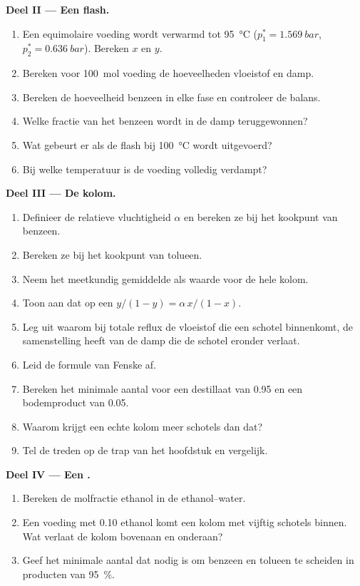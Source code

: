 \begin{problem}
\medskip
\noindent\textbf{Deel II --- Een flash.}
\begin{enumerate}[resume]
  \item Een equimolaire voeding wordt verwarmd tot \qty{95}{\degreeCelsius} ($p_1^* =
        \qty{1.569}{bar}$, $p_2^* = \qty{0.636}{bar}$). Bereken $x$ en $y$.
  \item Bereken voor \qty{100}{mol} voeding de hoeveelheden vloeistof en damp.
  \item Bereken de hoeveelheid benzeen in elke fase en controleer de balans.
  \item Welke fractie van het benzeen wordt in de damp teruggewonnen?
  \item Wat gebeurt er als de flash bij \qty{100}{\degreeCelsius} wordt uitgevoerd?
  \item Bij welke temperatuur is de voeding volledig verdampt?
\end{enumerate}

\medskip
\noindent\textbf{Deel III --- De kolom.}
\begin{enumerate}[resume]
  \item Definieer de relatieve vluchtigheid $\alpha$ en bereken ze bij het kookpunt
        van benzeen.
  \item Bereken ze bij het kookpunt van tolueen.
  \item Neem het meetkundig gemiddelde als waarde voor de hele kolom.
  \item Toon aan dat op een  $y/(1 - y) = \alpha\,x/(1 - x)$.
  \item Leg uit waarom bij totale reflux de vloeistof die een schotel binnenkomt, de
        samenstelling heeft van de damp die de schotel eronder verlaat.
  \item Leid de formule van Fenske af.
  \item Bereken het minimale aantal  voor een destillaat van
        0.95 en een bodemproduct van 0.05.
  \item Waarom krijgt een echte kolom meer schotels dan dat?
  \item Tel de treden op de trap van het hoofdstuk en vergelijk.
\end{enumerate}

\medskip
\noindent\textbf{Deel IV --- Een .}
\begin{enumerate}[resume]
  \item Bereken de molfractie ethanol in de  ethanol--water.
  \item Een voeding met 0.10 ethanol komt een kolom met vijftig schotels binnen. Wat verlaat
        de kolom bovenaan en onderaan?
  \item Geef het minimale aantal  dat nodig is om
        benzeen en tolueen te scheiden in producten van 95~\%.
\end{enumerate}
\end{problem}
